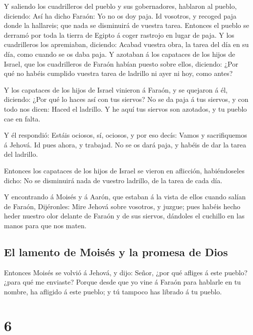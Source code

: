  Y saliendo los cuadrilleros del pueblo y sus
gobernadores, hablaron al pueblo, diciendo: Así ha dicho Faraón: Yo no
os doy paja.  Id vosotros, y recoged paja donde la
hallareis; que nada se disminuirá de vuestra tarea. 
Entonces el pueblo se derramó por toda la tierra de Egipto á coger
rastrojo en lugar de paja.  Y los cuadrilleros los
apremiaban, diciendo: Acabad vuestra obra, la tarea del día en su día,
como cuando se os daba paja.  Y azotaban á los capataces
de los hijos de Israel, que los cuadrilleros de Faraón habían puesto
sobre ellos, diciendo: ¿Por qué no habéis cumplido vuestra tarea de
ladrillo ni ayer ni hoy, como antes?

 Y los capataces de los hijos de Israel vinieron á
Faraón, y se quejaron á él, diciendo: ¿Por qué lo haces así con tus
siervos?  No se da paja á tus siervos, y con todo nos
dicen: Haced el ladrillo. Y he aquí tus siervos son azotados, y tu
pueblo cae en falta.

 Y él respondió: Estáis ociosos, sí, ociosos, y por eso
decís: Vamos y sacrifiquemos á Jehová.  Id pues ahora, y
trabajad. No se os dará paja, y habéis de dar la tarea del ladrillo.

 Entonces los capataces de los hijos de Israel se vieron
en aflicción, habiéndoseles dicho: No se disminuirá nada de vuestro
ladrillo, de la tarea de cada día.

 Y encontrando á Moisés y á Aarón, que estaban á la vista
de ellos cuando salían de Faraón,  Dijéronles: Mire
Jehová sobre vosotros, y juzgue; pues habéis hecho heder nuestro olor
delante de Faraón y de sus siervos, dándoles el cuchillo en las manos
para que nos maten.

\hypertarget{el-lamento-de-moisuxe9s-y-la-promesa-de-dios}{%
\subsection{El lamento de Moisés y la promesa de
Dios}\label{el-lamento-de-moisuxe9s-y-la-promesa-de-dios}}

 Entonces Moisés se volvió á Jehová, y dijo: Señor, ¿por
qué afliges á este pueblo? ¿para qué me enviaste?  Porque
desde que yo vine á Faraón para hablarle en tu nombre, ha afligido á
este pueblo; y tú tampoco has librado á tu pueblo.

\hypertarget{section-02-6}{%
\section{6}\label{section-02-6}}

